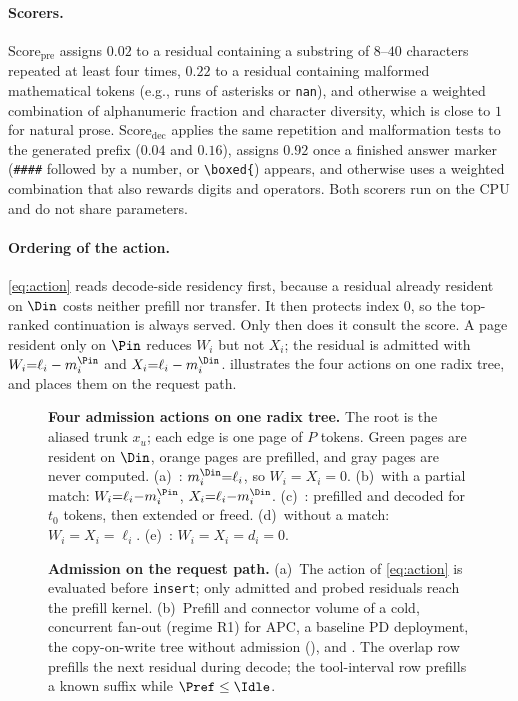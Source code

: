 \paragraph{Scorers.}
$\mathrm{Score}_{\mathrm{pre}}$ assigns $0.02$ to a residual containing a substring of $8$--$40$ characters repeated at least four times, $0.22$ to a residual containing malformed mathematical tokens (e.g., runs of asterisks or \texttt{nan}), and otherwise a weighted combination of alphanumeric fraction and character diversity, which is close to $1$ for natural prose.
$\mathrm{Score}_{\mathrm{dec}}$ applies the same repetition and malformation tests to the generated prefix ($0.04$ and $0.16$), assigns $0.92$ once a finished answer marker (\texttt{\#\#\#\#} followed by a number, or \texttt{\textbackslash boxed\{}) appears, and otherwise uses a weighted combination that also rewards digits and operators.
Both scorers run on the CPU and do not share parameters.

\paragraph{Ordering of the action.}
\eqref{eq:action} reads decode-side residency first, because a residual already resident on $\Din$ costs neither prefill nor transfer.
It then protects index $0$, so the top-ranked continuation is always served.
Only then does it consult the score.
A page resident only on $\Pin$ reduces $W_i$ but not $X_i$; the residual is admitted with $W_i{=}\ell_i-m_i^{\Pin}$ and $X_i{=}\ell_i-m_i^{\Din}$.
 illustrates the four actions on one radix tree, and  places them on the request path.

\begin{figure}[t]
\centering
\resizebox{\textwidth}{!}{}
\caption{\textbf{Four admission actions on one radix tree.}
The root is the aliased trunk $x_u$; each edge is one page of $P$ tokens.
Green pages are resident on $\Din$, orange pages are prefilled, and gray pages are never computed.
(a)~\Hit: $m_i^{\Din}{=}\ell_i$, so $W_i{=}X_i{=}0$.
(b)~\Admit with a partial match: $W_i{=}\ell_i{-}m_i^{\Pin}$, $X_i{=}\ell_i{-}m_i^{\Din}$.
(c)~\Probe: prefilled and decoded for $t_0$ tokens, then extended or freed.
(d)~\Admit without a match: $W_i{=}X_i{=}\ell_i$.
(e)~\Reject: $W_i{=}X_i{=}d_i{=}0$.}
\label{fig:radix}
\end{figure}

\begin{figure}[t]
\centering
\resizebox{\textwidth}{!}{}
\caption{\textbf{Admission on the request path.}
(a)~The action of \eqref{eq:action} is evaluated before \texttt{insert}; only admitted and probed residuals reach the prefill kernel.
(b)~Prefill and connector volume of a cold, concurrent fan-out (regime R1) for APC, a baseline PD deployment, the copy-on-write tree without admission (\cowonly), and \sys.
The overlap row prefills the next residual during decode; the tool-interval row prefills a known suffix while $\Pref\le\Idle$.}
\label{fig:app}
\end{figure}

